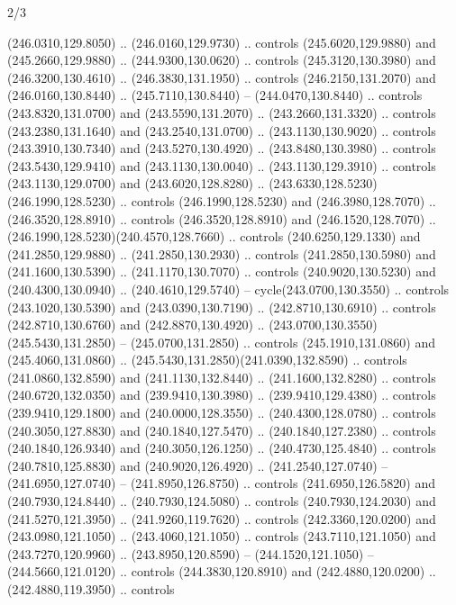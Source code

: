 \begin{flagdescription}{2/3}
\begin{scope}[xshift=0.5\flaglength,yshift=0.5\flagwidth,scale=\flagwidth/259.2]
\begin{scope}[y=0.8pt, x=0.8pt, yscale=-1,shift={(-243,-162)}]
      (246.0310,129.8050) .. (246.0160,129.9730) .. controls (245.6020,129.9880) and
      (245.2660,129.9880) .. (244.9300,130.0620) .. controls (245.3120,130.3980) and
      (246.3200,130.4610) .. (246.3830,131.1950) .. controls (246.2150,131.2070) and
      (246.0160,130.8440) .. (245.7110,130.8440) -- (244.0470,130.8440) .. controls
      (243.8320,131.0700) and (243.5590,131.2070) .. (243.2660,131.3320) .. controls
      (243.2380,131.1640) and (243.2540,131.0700) .. (243.1130,130.9020) .. controls
      (243.3910,130.7340) and (243.5270,130.4920) .. (243.8480,130.3980) .. controls
      (243.5430,129.9410) and (243.1130,130.0040) .. (243.1130,129.3910) .. controls
      (243.1130,129.0700) and (243.6020,128.8280) ..
      (243.6330,128.5230)(246.1990,128.5230) .. controls (246.1990,128.5230) and
      (246.3980,128.7070) .. (246.3520,128.8910) .. controls (246.3520,128.8910) and
      (246.1520,128.7070) .. (246.1990,128.5230)(240.4570,128.7660) .. controls
      (240.6250,129.1330) and (241.2850,129.9880) .. (241.2850,130.2930) .. controls
      (241.2850,130.5980) and (241.1600,130.5390) .. (241.1170,130.7070) .. controls
      (240.9020,130.5230) and (240.4300,130.0940) .. (240.4610,129.5740) --
      cycle(243.0700,130.3550) .. controls (243.1020,130.5390) and
      (243.0390,130.7190) .. (242.8710,130.6910) .. controls (242.8710,130.6760) and
      (242.8870,130.4920) .. (243.0700,130.3550)(245.5430,131.2850) --
      (245.0700,131.2850) .. controls (245.1910,131.0860) and (245.4060,131.0860) ..
      (245.5430,131.2850)(241.0390,132.8590) .. controls (241.0860,132.8590) and
      (241.1130,132.8440) .. (241.1600,132.8280) .. controls (240.6720,132.0350) and
      (239.9410,130.3980) .. (239.9410,129.4380) .. controls (239.9410,129.1800) and
      (240.0000,128.3550) .. (240.4300,128.0780) .. controls (240.3050,127.8830) and
      (240.1840,127.5470) .. (240.1840,127.2380) .. controls (240.1840,126.9340) and
      (240.3050,126.1250) .. (240.4730,125.4840) .. controls (240.7810,125.8830) and
      (240.9020,126.4920) .. (241.2540,127.0740) -- (241.6950,127.0740) --
      (241.8950,126.8750) .. controls (241.6950,126.5820) and (240.7930,124.8440) ..
      (240.7930,124.5080) .. controls (240.7930,124.2030) and (241.5270,121.3950) ..
      (241.9260,119.7620) .. controls (242.3360,120.0200) and (243.0980,121.1050) ..
      (243.4060,121.1050) .. controls (243.7110,121.1050) and (243.7270,120.9960) ..
      (243.8950,120.8590) -- (244.1520,121.1050) -- (244.5660,121.0120) .. controls
      (244.3830,120.8910) and (242.4880,120.0200) .. (242.4880,119.3950) .. controls

\end{scope}
\end{scope}
\end{flagdescription}
